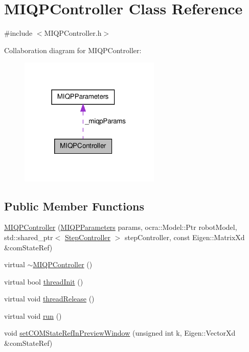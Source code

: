 \hypertarget{classMIQPController}{\section{\-M\-I\-Q\-P\-Controller \-Class \-Reference}
\label{classMIQPController}
}


{\ttfamily \#include $<$\-M\-I\-Q\-P\-Controller.\-h$>$}



\-Collaboration diagram for \-M\-I\-Q\-P\-Controller\-:\nopagebreak
\begin{figure}[H]
\begin{center}
\leavevmode
\includegraphics[width=190pt]{classMIQPController__coll__graph}
\end{center}
\end{figure}
\subsection*{\-Public \-Member \-Functions}
\begin{DoxyCompactItemize}
\item 
\hyperlink{classMIQPController_a5fec189a29105d999d3bb2721977945a}{\-M\-I\-Q\-P\-Controller} (\hyperlink{structMIQPParameters}{\-M\-I\-Q\-P\-Parameters} params, ocra\-::\-Model\-::\-Ptr robot\-Model, std\-::shared\-\_\-ptr$<$ \hyperlink{classStepController}{\-Step\-Controller} $>$ step\-Controller, const \-Eigen\-::\-Matrix\-Xd \&com\-State\-Ref)
\item 
virtual \hyperlink{classMIQPController_a46e1cc8dba1633a49d934aa20730e358}{$\sim$\-M\-I\-Q\-P\-Controller} ()
\item 
virtual bool \hyperlink{classMIQPController_a7e82a26dc823c7f69d00997d0ca98052}{thread\-Init} ()
\item 
virtual void \hyperlink{classMIQPController_a43faa045ed47859b04f39e99805888c1}{thread\-Release} ()
\item 
virtual void \hyperlink{classMIQPController_aa8fd8452a14d8e7731bf45044e1c7a59}{run} ()
\item 
void \hyperlink{classMIQPController_a69b193f0aab0fa0d0ec439b4d1b2a65f}{set\-C\-O\-M\-State\-Ref\-In\-Preview\-Window} (unsigned int k, \-Eigen\-::\-Vector\-Xd \&com\-State\-Ref)
\end{DoxyCompactItemize}
